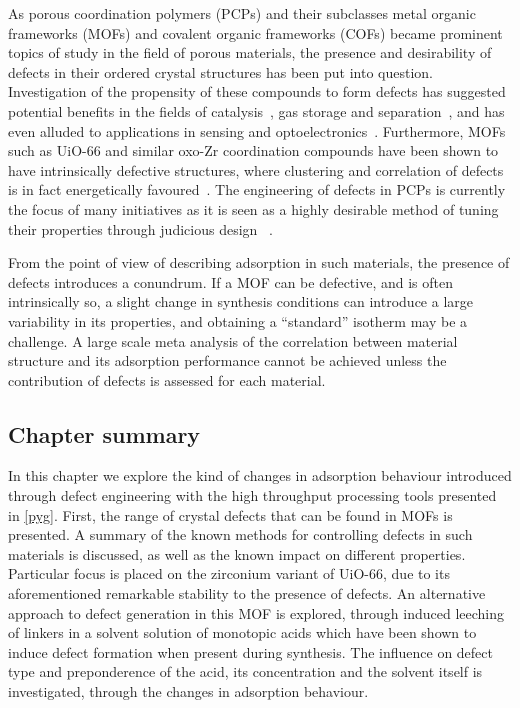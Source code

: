 As porous coordination polymers (PCPs) and their subclasses
metal organic frameworks (MOFs) and covalent organic frameworks (COFs)
became prominent topics of study in the field of porous materials,
the presence and desirability of defects in their ordered crystal
structures has been put into question. Investigation of the 
propensity of these compounds to form defects has suggested 
potential benefits in the fields of 
catalysis~\cite{shollDefectsMetalOrganic2015}, gas storage
and separation~\cite{%
    choiRoleStructuralDefects2018,%
    ghoshWaterAdsorptionUiO662014,%
    liSelectiveGasAdsorption2009%
}, and has even alluded to applications in
sensing and optoelectronics~\cite{cliffeMetalOrganicNanosheets2017}.
Furthermore, MOFs
such as UiO-66 and similar oxo-Zr coordination compounds have been 
shown to have intrinsically defective structures, where clustering 
and correlation of defects is in fact energetically 
favoured~\cite{cliffeCorrelatedDefectNanoregions2014}.
The engineering of defects in PCPs is currently the focus of many
initiatives as it is seen as a highly desirable method of tuning 
their properties through judicious design
~\cite{
    shollDefectsMetalOrganic2015,%
    bennettInterplayDefectsDisorder2016,%
    liangLinkingDefectsHierarchical2018%
}.

From the point of view of describing adsorption in 
such materials, the presence of defects introduces a conundrum.
If a MOF can be defective, and is often intrinsically so,
a slight change in synthesis conditions can introduce a 
large variability in its properties, and obtaining a 
``standard'' isotherm may be a challenge. A large scale
meta analysis of the correlation between material structure
and its adsorption performance cannot be achieved unless
the contribution of defects is assessed for each material.

\subsection*{Chapter summary}

In this chapter we explore the kind of changes in 
adsorption behaviour introduced through defect engineering with 
the high throughput processing tools presented in \autoref{pyg}.
First, the range of crystal defects that can be found in MOFs 
is presented. A summary of the known methods for controlling defects in
such materials is discussed, as well as the known impact on 
different properties.
Particular focus is placed on the zirconium variant of UiO-66,
due to its aforementioned remarkable stability to the presence of defects.
An alternative approach to defect generation in this MOF is explored,
through induced leeching of linkers in a solvent solution of monotopic
acids which have been shown to induce defect formation when present
during synthesis. The influence on defect type and preponderence 
of the acid, its concentration and 
the solvent itself is investigated, through the changes in 
adsorption behaviour.

